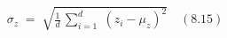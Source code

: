 \documentclass[preview]{standalone}
\begin{document}
\begin{align*}
\sigma_z \;=\; \sqrt{\frac{1}{d}\,\sum_{i=1}^{d}\;(z_i - \mu_z)^2}\quad (8.15)
\end{align*}
\end{document}
